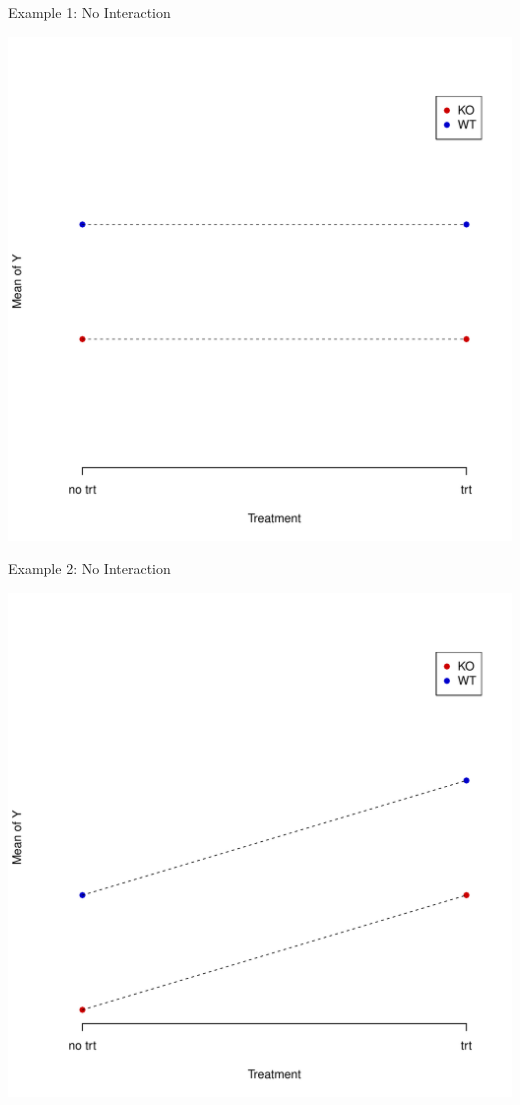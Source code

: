 \documentclass[xcolor=x11names,compress]{beamer}\usepackage[]{graphicx}\usepackage[]{color}
\newenvironment{knitrout}{}{} %
\begin{document}
\begin{frame}{Example 1: No Interaction}
\begin{knitrout}\tiny
{}\color{fgcolor}

{\centering \includegraphics[width=.6\linewidth]{figure/beamer-unnamed-chunk-89-1} 

}



\end{knitrout}
\end{frame}

\begin{frame}{Example 2: No Interaction}
\begin{knitrout}\tiny
{}\color{fgcolor}

{\centering \includegraphics[width=.6\linewidth]{figure/beamer-unnamed-chunk-90-1} 

}



\end{knitrout}
\end{frame}
\end{document}
